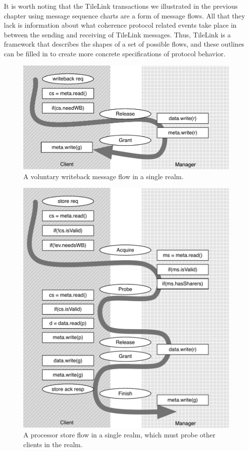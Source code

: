 It is worth noting that the TileLink transactions we illustrated in the previous chapter using message sequence charts
are a form of message flows.
All that they lack is information about what coherence protocol related events take place in between the sending
and receiving of TileLink messages.
Thus, TileLink is a framework that describes the shapes of a set of possible flows,
and these outlines can be filled in to create more concrete specifications of protocol behavior.

\begin{figure}
\centering
\includegraphics[width=0.8\columnwidth]{coherence/figures/rel-flow.pdf}
\caption[A volunary writback flow.]{
A voluntary writeback message flow in a single realm.
}
\label{fig:rel-flow}
\end{figure}

\begin{figure}
\centering
\includegraphics[width=0.8\columnwidth]{coherence/figures/acq-flow.pdf}
\caption[A processor store flow.]{
A processor store flow in a single realm, which must probe other clients in the realm.
}
\label{fig:acq-flow}
\end{figure}

